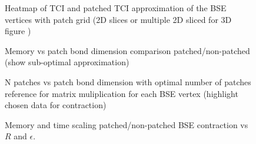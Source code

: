 \begin{figure}[ht!]
    \caption{Heatmap of TCI and patched TCI approximation of the BSE vertices with patch grid (2D slices or multiple 2D sliced for 3D figure )}
\end{figure}

\begin{figure}[ht!]
    \caption{Memory vs patch bond dimension comparison patched/non-patched (show sub-optimal approximation)}
\end{figure}

\begin{figure}[ht!]
    \caption{N patches vs patch bond dimension with optimal number of patches reference for matrix muliplication for each BSE vertex (highlight chosen data for contraction)}
\end{figure}

\begin{figure}[ht!]
    \caption{Memory and time scaling patched/non-patched BSE contraction vs $R$ and $\epsilon$.}
\end{figure}











